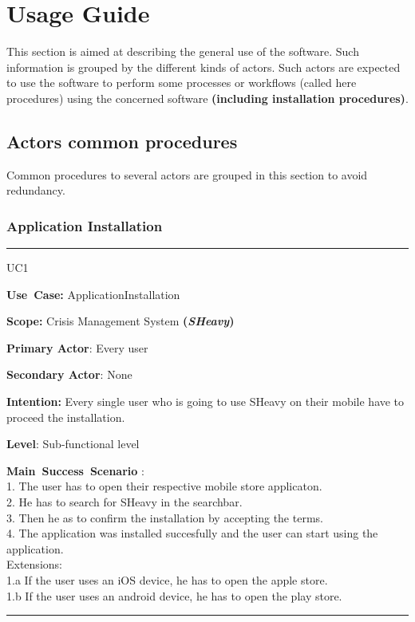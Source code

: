 \chapter{Usage Guide}
\label{chap:usage_guide}

This section is aimed at describing the general use of the software. Such
information is grouped by the different kinds of actors.
Such actors are expected to use the software to perform some
processes or workflows (called here procedures) using the concerned software
\textbf{(including installation procedures)}.

\section{Actors common procedures}
Common procedures to several actors are grouped in this section to avoid
redundancy.

\subsection{Application Installation}
\vspace{0.5cm} 
\hrule
\vspace{0.5cm}
\begin{lyxlist}{UC1}
\small{
\item [\textbf{Use~Case:}] ApplicationInstallation
\item [\textbf{Scope:}] Crisis Management System \textbf{(\emph{SHeavy})}
\item [\textbf{Primary Actor}:] Every user
\item [\textbf{Secondary Actor}:] None
\item [\textbf{Intention:}] Every single user who is going to use SHeavy on
their mobile have to proceed the installation.
\item [\textbf{Level}:]Sub-functional level
\item [\textbf{Main~Success~Scenario}]:\\
1. The user has to open their respective mobile store applicaton.\\
2. He has to search for SHeavy in the searchbar.\\
3. Then he as to confirm the installation by accepting the terms.\\
4. The application was installed succesfully and the user can start using the
application.\\
Extensions:\\
	1.a If the user uses an iOS device, he has to open the apple store.\\
	1.b If the user uses an android device, he has to open the play store.\\	
}
\end{lyxlist}
\hrule 
\vspace{0.5cm}

